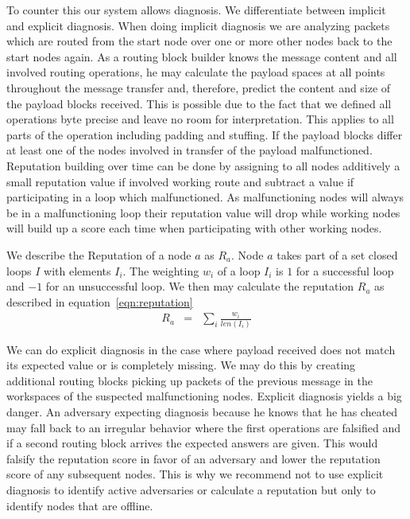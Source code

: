 To counter this our system allows diagnosis. We differentiate between implicit and explicit diagnosis. When doing implicit diagnosis we are analyzing packets which are routed from the start node over one or more other nodes back to the start nodes again. As a routing block builder knows the message content and all involved routing operations, he may calculate the payload spaces at all points throughout the message transfer and, therefore, predict the content and size of the payload blocks received.  This is possible due to the fact that we defined all operations byte precise and leave no room for interpretation. This applies to all parts of the operation including padding and stuffing. If the payload blocks differ at least one of the nodes involved in transfer of the payload malfunctioned. Reputation building over time can be done by assigning to all nodes additively a small reputation value if involved working route and subtract a value if participating in a loop which malfunctioned. As malfunctioning nodes will always be in a malfunctioning loop their reputation value will drop while working nodes will build up a score each time when participating with other working nodes.

We describe the Reputation of a node $a$ as $R_a$. Node $a$ takes part of a set closed loops $I$ with elements $I_i$. The weighting $w_i$ of a loop $I_i$ is $1$ for a successful loop and $-1$ for an unsuccessful loop. We then may calculate the reputation $R_a$ as described in equation~\ref{eqn:reputation}
\begin{eqnarray}
	R_a & = & \sum_{i}{\frac{w_i}{len\left(I_i\right)}}\label{eqn:reputation}
\end{eqnarray} 

We can do explicit diagnosis in the case where payload received does not match its expected value or is completely missing. We may do this by creating additional routing blocks picking up packets of the previous message in the workspaces of the suspected malfunctioning nodes. Explicit diagnosis yields a big danger. An adversary expecting diagnosis because he knows that he has cheated may fall back to an irregular behavior where the first operations are falsified and if a second routing block arrives the expected answers are given. This would falsify the reputation score in favor of an adversary and lower the reputation score of any subsequent nodes. This is why we recommend not to use explicit diagnosis to identify active adversaries or calculate a reputation but only to identify nodes that are offline.

